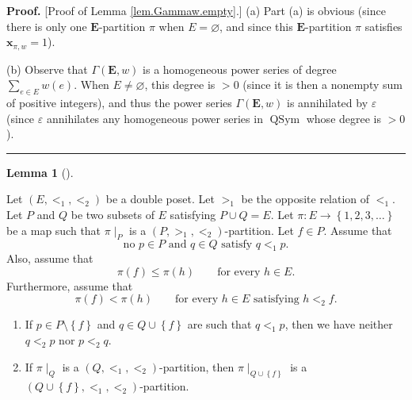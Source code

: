 \documentclass[numbers=enddot,12pt,final,onecolumn,notitlepage,abstracton]{scrartcl}
\theoremstyle{definition}
\newtheorem{lem}[theo]{Lemma}
\newenvironment{lemma}[1][]
{\begin{lem}[#1]\begin{leftbar}}
{\end{leftbar}\end{lem}}
\newenvironment{proof}[1][Proof]{\noindent\textbf{#1.} }{\ \rule{0.5em}{0.5em}}
\let\sumnonlimits\sum
\renewcommand{\sum}{\sumnonlimits\limits}
\newcommand{\xx}{{\mathbf{x}}}
\newcommand{\QSym}{{\operatorname{QSym}}}
\newcommand{\EE}{{\mathbf{E}}}
\begin{document}
\begin{proof}
[Proof of Lemma \ref{lem.Gammaw.empty}.] (a) Part (a) is obvious (since there is
only one $\EE$-partition $\pi$ when $E=\varnothing$, and since
this $\EE$-partition $\pi$ satisfies $\xx_{\pi, w} = 1$).

(b) Observe that $\Gamma \left( \EE, w \right)$ is a homogeneous power
series of degree $\sum_{e\in E} w\left( e \right)$. When $E \neq \varnothing$,
this degree is $>0$ (since it is then a nonempty sum of positive integers),
and thus the power series $\Gamma \left( \EE, w \right)$
is annihilated by $\varepsilon$ (since $\varepsilon$ annihilates any
homogeneous power series in $\QSym$ whose degree is $> 0$).
\end{proof}

\begin{lemma}
\label{lem.Gammaw.toggle}
Let $\left(E, <_1, <_2\right)$ be a double poset. Let $>_1$ be the opposite
relation of $<_1$. Let $P$ and $Q$ be two
subsets of $E$ satisfying $P \cup Q = E$.
Let $\pi : E \to \left\{1, 2, 3, \ldots\right\}$ be a map such
that $\pi \mid_P$ is a $\left(P, >_1, <_2\right)$-partition.
Let $f \in P$. Assume that
\begin{equation}
\text{no } p \in P \text{ and } q \in Q \text{ satisfy }
q <_1 p.
\label{eq.lem.Gammaw.toggle.eq0}
\end{equation}
Also, assume that
\begin{equation}
\pi\left( f \right) \leq \pi\left( h \right)
\qquad \text{for every } h \in E .
\label{eq.lem.Gammaw.toggle.eq1}
\end{equation}
Furthermore, assume that
\begin{equation}
\pi \left( f \right) < \pi \left( h \right)
\qquad \text{for every } h \in E \text{ satisfying } h <_2 f .
\label{eq.lem.Gammaw.toggle.eq2}
\end{equation}

\begin{enumerate}
\item[(a)] If $p \in P \setminus \left\{f\right\}$
and $q \in Q \cup \left\{f\right\}$ are such that
$q <_1 p$, then we have neither $q <_2 p$ nor
$p <_2 q$.

\item[(b)] If $\pi \mid_Q$ is a $\left(Q, <_1, <_2\right)$-partition,
then
$\pi \mid_{Q \cup \left\{f\right\}}$ is a
$\left(Q \cup \left\{f\right\}, <_1, <_2\right)$-partition.
\end{enumerate}
\end{lemma}
\end{document}
